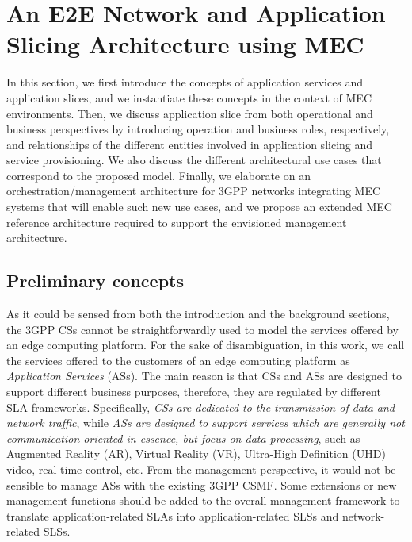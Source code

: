 \section{An E2E Network and Application Slicing Architecture using MEC}
\label{sec:app_slice}
\noindent
In this section, we first introduce the concepts of application services and application slices, and we instantiate these concepts in the context of MEC environments. Then, we discuss application slice from both operational and business perspectives by introducing operation and business roles, respectively, and relationships of the different entities involved in application slicing and service provisioning. We also discuss the different architectural use cases that correspond to the proposed model. Finally, we elaborate on an orchestration/management architecture for 3GPP networks integrating MEC systems that will enable such new use cases, and we propose an extended MEC reference architecture required to support the envisioned management architecture.   
\subsection{Preliminary concepts}
\label{sec:pre_concepts}
\noindent
As it could be sensed from both the introduction and the background sections, the 3GPP CSs cannot be straightforwardly used to model the services offered by an edge computing platform. For the sake of disambiguation, in this work, we call the services offered to the customers of an edge computing platform as \textit{Application Services} (ASs). The main reason is that CSs and ASs are designed to support different business purposes, therefore, they are regulated by different SLA frameworks. Specifically, \textit{CSs are dedicated to the transmission of data and network traffic}, while \textit{ASs are designed to support services which are generally not communication oriented in essence, but focus on data processing}, such as Augmented Reality (AR), Virtual Reality (VR), Ultra-High Definition (UHD) video, real-time control, etc. From the management perspective, it would not be sensible to manage ASs with the existing 3GPP CSMF. Some extensions or new management functions should be added to the overall management framework to translate application-related SLAs into application-related SLSs and network-related SLSs. 

